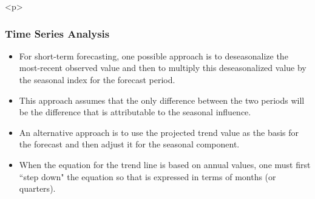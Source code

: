 \documentclass{beamer}
\begin{document}


<p>
\frametitle{Time Series Analysis}
\begin{itemize}
\item For short-term forecasting, one possible approach is to deseasonalize the most-recent observed value and
then to multiply this deseasonalized value by the seasonal index for the forecast period. 
\item This approach assumes
that the only difference between the two periods will be the difference that is attributable to the seasonal
influence. 
\item An alternative approach is to use the projected trend value as the basis for the forecast and then adjust
it for the seasonal component. 
\item When the equation for the trend line is based on annual values, one must first
``step down" the equation so that is expressed in terms of months (or quarters). 
\end{itemize}
\end{document}
